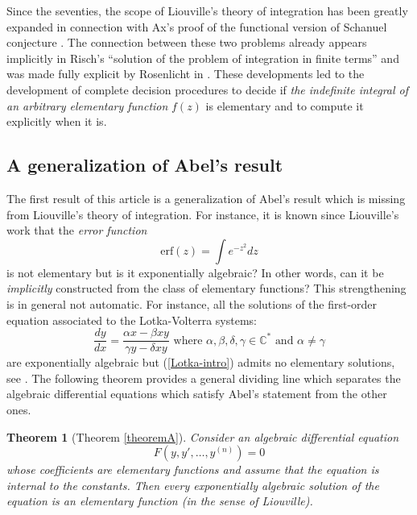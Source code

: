 \documentclass[12pt]{amsart}
\theoremstyle{definition}
\theoremstyle{plain}
\theoremstyle{exampstyle}\newtheorem{thmx}{Theorem}
\theoremstyle{exampstyle}\newtheorem{thmxbis}{Theorem}
\begin{document}
Since the seventies, the scope of Liouville's theory of integration has been greatly expanded in connection with Ax's proof of the functional version of Schanuel conjecture \cite{Ax-Theorem}. The connection between these two problems already appears implicitly in Risch's ``solution of the problem of integration in finite terms'' \cite{Risch2} and was made fully explicit by Rosenlicht in \cite{Rosenlicht}. These developments led to the development of complete decision procedures \cite{Risch2, Bronstein, Singer-Raab,Pila-Tsimerman} to decide if {\em the indefinite integral of an arbitrary elementary function} $f(z)$ is elementary and to compute it explicitly when it is. 





\subsection{A generalization of Abel's result} The first result of this article is a generalization of Abel's result which is missing from Liouville's theory of integration. For instance, it is known since Liouville's work that the {\em error function}
$$\mathrm{erf}(z) = \int e^{-z^2} dz$$ 
is not elementary but is it exponentially algebraic? In other words, can it be {\em implicitly} constructed from the class of elementary functions? This strengthening is in general not automatic. For instance, all the solutions of the first-order equation associated to the Lotka-Volterra systems:
\begin{equation}\label{Lotka-intro}
\frac {dy} {dx} = \frac{\alpha x - \beta xy}{\gamma y - \delta xy} \text{ where } \alpha, \beta,\delta,\gamma \in \mathbb{C}^\ast \text{ and } \alpha \neq \gamma
\end{equation}
are exponentially algebraic but (\ref{Lotka-intro}) admits no elementary solutions, see  \cite{Duan-Nagloo,DEJ}. The following theorem provides a general dividing line which separates the algebraic differential equations which satisfy Abel's statement from the other ones.

\begin{thmx}[Theorem \ref{theoremA}] \label{intro-thmA}
Consider an algebraic differential equation 
\begin{equation} \label{equation-TheoremA} 
F(y,y',\ldots, y^{(n)}) = 0
\end{equation}
whose coefficients are elementary functions and assume that the equation is {\em internal to the constants}. Then every exponentially algebraic solution of the equation is an elementary function (in the sense of Liouville).
\end{thmx} 
\end{document}

